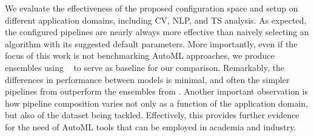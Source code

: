 We evaluate the effectiveness of the proposed configuration space and setup on different application domains, including CV, NLP, and TS analysis. As expected, the configured pipelines are nearly always more effective than naively selecting an algorithm with its suggested default parameters. More importantly, even if the focus of this work is not benchmarking AutoML approaches, we produce ensembles using \autosklearn~\cite{auto-sklearn} to serve as baseline for our comparison. Remarkably, the differences in performance between models is minimal, and often the simpler pipelines from \isklearn outperform the ensembles from \autosklearn. Another important observation is how pipeline composition varies not only as a function of the application domain, but also of the dataset being tackled. Effectively, this provides further evidence for the need of AutoML tools that can be employed in academia and industry.

